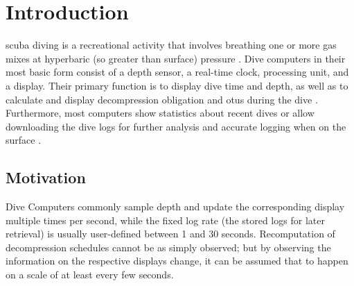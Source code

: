 
\chapter{Introduction}



\gls{scuba} diving is a recreational activity that involves breathing one or more gas mixes at hyperbaric (so greater than surface) pressure \cite{physics-of-diving-1984}.
Dive computers in their most basic form consist of a depth sensor, a real-time clock, processing unit, and a display. 
Their primary function is to display dive time and depth, as well as to calculate and display decompression obligation and \gls{otu}s during the dive \cite{history-of-dive-computer}. 
Furthermore, most computers show statistics about recent dives or allow downloading the dive logs for further analysis and accurate logging when on the surface \cite{review-technical-specs-dive-computer-2010}\cite{silent-witness-dive-computer-2014}.

\section{Motivation}
Dive Computers commonly sample depth and update the corresponding display multiple times per second, while the fixed log rate (the stored logs for later retrieval) is usually user-defined between 1 and 30 seconds. Recomputation of decompression schedules cannot be as simply observed; but by observing the information on the respective displays change, it can be assumed that to happen on a scale of at least every few seconds.

